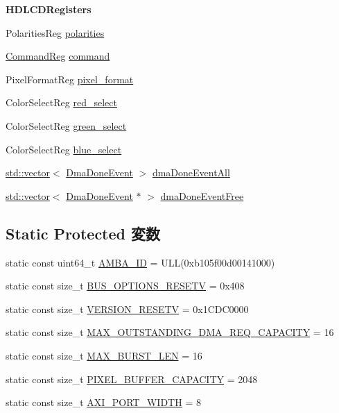 \begin{Indent}{\bf HDLCDRegisters}
\begin{DoxyCompactItemize}
\item 
PolaritiesReg \hyperlink{classHDLcd_a1b4fe6c75f98c50fad2eebc75f143dd2}{polarities}
\item 
\hyperlink{structCommandReg}{CommandReg} \hyperlink{classHDLcd_a9c5f330aee81c99b318a53af189fbc98}{command}
\item 
PixelFormatReg \hyperlink{classHDLcd_aadff074534cd557dcaa412b3a5860be5}{pixel\_\-format}
\item 
ColorSelectReg \hyperlink{classHDLcd_afd72c0120af049b009667393e8d7ce77}{red\_\-select}
\item 
ColorSelectReg \hyperlink{classHDLcd_abe59898cf9345a10d5927b545e832923}{green\_\-select}
\item 
ColorSelectReg \hyperlink{classHDLcd_af7a5fa704ed84e7d98a264c3ddd8b794}{blue\_\-select}
\end{DoxyCompactItemize}
\end{Indent}
\begin{Indent}{\bf }\par
{\em \label{_amgrpd41d8cd98f00b204e9800998ecf8427e}
 }\begin{DoxyCompactItemize}
\item 
\hyperlink{classstd_1_1vector}{std::vector}$<$ \hyperlink{classHDLcd_1_1DmaDoneEvent}{DmaDoneEvent} $>$ \hyperlink{classHDLcd_aa50a0179a2d530a0a45d74b014c425fe}{dmaDoneEventAll}
\item 
\hyperlink{classstd_1_1vector}{std::vector}$<$ \hyperlink{classHDLcd_1_1DmaDoneEvent}{DmaDoneEvent} $\ast$ $>$ \hyperlink{classHDLcd_ada9c1832b166debd201f034b2fcb4ab2}{dmaDoneEventFree}
\end{DoxyCompactItemize}
\end{Indent}
\subsection*{Static Protected 変数}
\begin{DoxyCompactItemize}
\item 
static const uint64\_\-t \hyperlink{classHDLcd_ae438dff5177bb7a98567cd94061edab4}{AMBA\_\-ID} = ULL(0xb105f00d00141000)
\item 
static const size\_\-t \hyperlink{classHDLcd_aaf19ce46531fc85edba07a0a76b30a5f}{BUS\_\-OPTIONS\_\-RESETV} = 0x408
\item 
static const size\_\-t \hyperlink{classHDLcd_a0cd2a036c21a49eadcc056ff0f20f8dd}{VERSION\_\-RESETV} = 0x1CDC0000
\item 
static const size\_\-t \hyperlink{classHDLcd_a5f08b80b40d4315ead7617e660bab910}{MAX\_\-OUTSTANDING\_\-DMA\_\-REQ\_\-CAPACITY} = 16
\item 
static const size\_\-t \hyperlink{classHDLcd_aace62e6eea905bd83b1d848acf8e39c9}{MAX\_\-BURST\_\-LEN} = 16
\item 
static const size\_\-t \hyperlink{classHDLcd_a43f658311547cdd328f725c29f629d43}{PIXEL\_\-BUFFER\_\-CAPACITY} = 2048
\item 
static const size\_\-t \hyperlink{classHDLcd_a707d5982e8851aee47eb1250db1c4c3b}{AXI\_\-PORT\_\-WIDTH} = 8
\end{DoxyCompactItemize}
